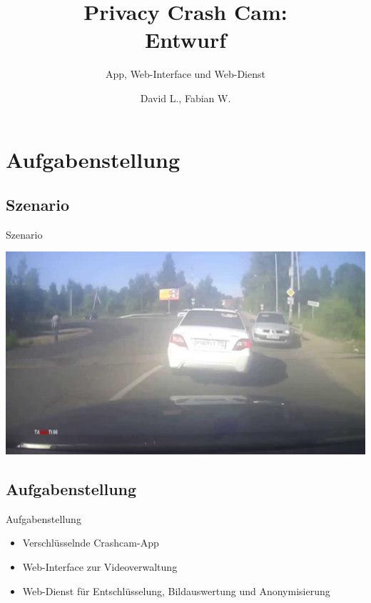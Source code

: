 \documentclass[19pt]{beamer}
\title[PCC]{Privacy Crash Cam:\\ Entwurf}
\subtitle{App, Web-Interface und Web-Dienst}
\author{David L., Fabian W.}
\institute{Fraunhofer Institut f\"ur Optronik, Systemtechnik und Bildauswertung, (KIT)}
\begin{document}

\begin{frame}
	\titlepage
\end{frame}

\section{Aufgabenstellung}
\subsection{Szenario}
\begin{frame}{Szenario}
	\begin{center}
		\includegraphics[scale=0.25]{logos/UnfallSzenario2} 
	\end{center}
\end{frame}

\subsection{Aufgabenstellung}
\begin{frame}{Aufgabenstellung}
	\begin{itemize}
		\item Verschl\"usselnde Crashcam-App
		\item Web-Interface zur Videoverwaltung
		\item Web-Dienst f\"ur Entschl\"usselung, Bildauswertung und Anonymisierung
	\end{itemize}
\end{frame}
\end{document}
